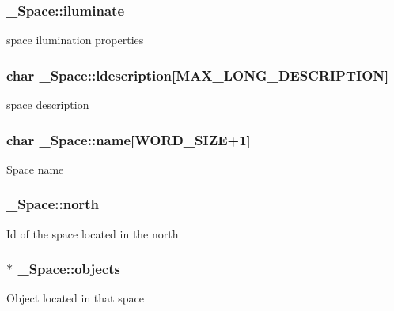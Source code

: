 \subsubsection[{\texorpdfstring{iluminate}{iluminate}}]{ \+\_\+\+Space\+::iluminate}\hypertarget{struct__Space_a3e7f0cd158600936103895aa2bb9f0b4}{}\label{struct__Space_a3e7f0cd158600936103895aa2bb9f0b4}
space ilumination properties 
\subsubsection[{\texorpdfstring{ldescription}{ldescription}}]{\setlength{\rightskip}{0pt plus 5cm}char \+\_\+\+Space\+::ldescription\mbox{[}{\bf M\+A\+X\+\_\+\+L\+O\+N\+G\+\_\+\+D\+E\+S\+C\+R\+I\+P\+T\+I\+ON}\mbox{]}}\hypertarget{struct__Space_a6cf737a07c4a3cd79aa80062a06d73d3}{}\label{struct__Space_a6cf737a07c4a3cd79aa80062a06d73d3}
space description 
\subsubsection[{\texorpdfstring{name}{name}}]{\setlength{\rightskip}{0pt plus 5cm}char \+\_\+\+Space\+::name\mbox{[}{\bf W\+O\+R\+D\+\_\+\+S\+I\+ZE}+1\mbox{]}}\hypertarget{struct__Space_aa1c9c994c2d16ecf3ef46138685fdfdc}{}\label{struct__Space_aa1c9c994c2d16ecf3ef46138685fdfdc}
Space name 
\subsubsection[{\texorpdfstring{north}{north}}]{ \+\_\+\+Space\+::north}\hypertarget{struct__Space_ae5ebe53ce79514d7d2d93911e0159252}{}\label{struct__Space_ae5ebe53ce79514d7d2d93911e0159252}
Id of the space located in the north 
\subsubsection[{\texorpdfstring{objects}{objects}}]{$\ast$ \+\_\+\+Space\+::objects}\hypertarget{struct__Space_a661ed8b0fc8085b6db70188aa5085625}{}\label{struct__Space_a661ed8b0fc8085b6db70188aa5085625}
Object located in that space 
